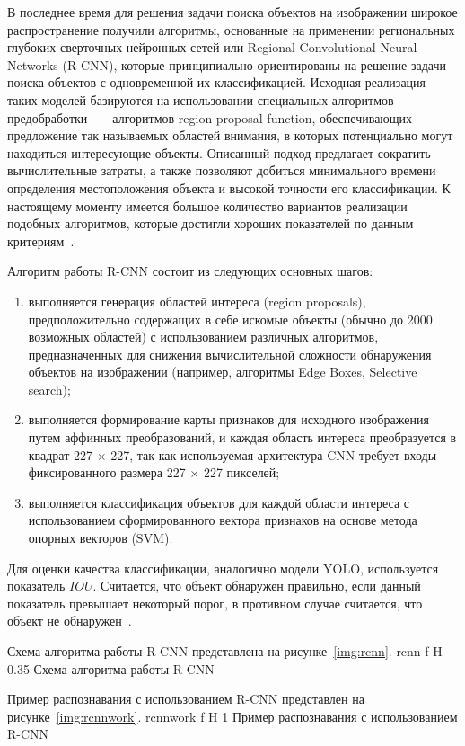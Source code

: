 В последнее время для решения задачи поиска объектов на изображении широкое распространение получили алгоритмы, основанные на применении региональных глубоких сверточных нейронных сетей или Regional Convolutional Neural Networks (R-CNN), которые принципиально ориентированы на решение задачи поиска объектов с одновременной их классификацией.
Исходная реализация таких моделей базируются на использовании специальных алгоритмов предобработки~---~алгоритмов region-proposal-function, обеспечивающих предложение так называемых областей внимания, в которых потенциально могут находиться интересующие объекты.
Описанный подход предлагает сократить вычислительные затраты, а также позволяют добиться минимального времени определения местоположения объекта и высокой точности его классификации.
К настоящему моменту имеется большое количество вариантов реализации подобных алгоритмов, которые достигли хороших показателей по данным критериям~\cite{rcnn}.

Алгоритм работы R-CNN состоит из следующих основных шагов:
\begin{enumerate}[leftmargin=1.6\parindent]
	\item выполняется генерация областей интереса (region proposals), предположительно содержащих в себе искомые объекты (обычно до 2000 возможных областей) с использованием различных алгоритмов, предназначенных для снижения вычислительной сложности обнаружения объектов на изображении (например, алгоритмы Edge Boxes, Selective search);
	\item выполняется формирование карты признаков для исходного изображения путем аффинных преобразований, и каждая область интереса преобразуется в квадрат 227 $\times$ 227,	так как используемая архитектура CNN требует входы фиксированного размера 227 $\times$ 227	пикселей;
	\item выполняется классификация объектов для каждой области интереса с использованием сформированного вектора признаков на основе метода опорных векторов (SVM).
\end{enumerate}
Для оценки качества классификации, аналогично модели YOLO, используется показатель $IOU$.
Считается, что объект обнаружен правильно, если данный показатель превышает некоторый порог, в противном случае считается, что объект не обнаружен~\cite{yolochina, rcnn}.

\clearpage
Схема алгоритма работы R-CNN представлена на рисунке~\ref{img:rcnn}.
	{rcnn}
	{f}
	{H}
	{0.35\textwidth}
	{Схема алгоритма работы R-CNN}

Пример распознавания с использованием R-CNN представлен на рисунке~\ref{img:rcnnwork}.
	{rcnnwork}
	{f}
	{H}
	{1\textwidth}
	{Пример распознавания с использованием R-CNN}

